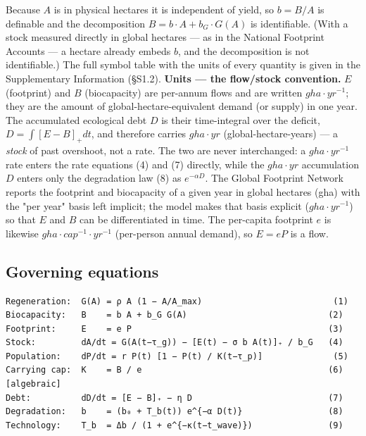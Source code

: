 \documentclass[11pt]{article}
\begin{document}
Because $A$ is in physical hectares it is independent of yield, so $b = B/A$ is definable and the decomposition $B = b\cdot{}A + b_{G}\cdot{}G(A)$ is identifiable. (With a stock measured directly in global hectares — as in the National Footprint Accounts — a hectare already embeds $b$, and the decomposition is not identifiable.) The full symbol table with the units of every quantity is given in the Supplementary Information (§S1.2). \textbf{Units — the flow/stock convention.} $E$ (footprint) and $B$ (biocapacity) are per-annum flows and are written $gha\cdot{}yr^{-1}$; they are the amount of global-hectare-equivalent demand (or supply) in one year. The accumulated ecological debt $D$ is their time-integral over the deficit, $D = \int{}[E - B]_{+} dt$, and therefore carries $gha\cdot{}yr$ (global-hectare-years) — a \emph{stock} of past overshoot, not a rate. The two are never interchanged: a $gha\cdot{}yr^{-1}$ rate enters the rate equations (4) and (7) directly, while the $gha\cdot{}yr$ accumulation $D$ enters only the degradation law (8) as $e^{-\alpha{}D}$. The Global Footprint Network reports the footprint and biocapacity of a given year in global hectares (gha) with the "per year" basis left implicit; the model makes that basis explicit ($gha\cdot{}yr^{-1}$) so that $E$ and $B$ can be differentiated in time. The per-capita footprint $e$ is likewise $gha\cdot{}cap^{-1}\cdot{}yr^{-1}$ (per-person annual demand), so $E = eP$ is a flow.

\subsection{Governing equations}

\begingroup\small\begin{verbatim}
Regeneration:  G(A) = ρ A (1 − A/A_max)                          (1)
Biocapacity:   B    = b A + b_G G(A)                            (2)
Footprint:     E    = e P                                       (3)
Stock:         dA/dt = G(A(t−τ_g)) − [E(t) − σ b A(t)]₊ / b_G   (4)
Population:    dP/dt = r P(t) [1 − P(t) / K(t−τ_p)]              (5)
Carrying cap:  K    = B / e                                     (6)   [algebraic]
Debt:          dD/dt = [E − B]₊ − η D                           (7)
Degradation:   b    = (b₀ + T_b(t)) e^{−α D(t)}                 (8)
Technology:    T_b  = Δb / (1 + e^{−κ(t−t_wave)})               (9)
\end{verbatim}\endgroup
\end{document}
